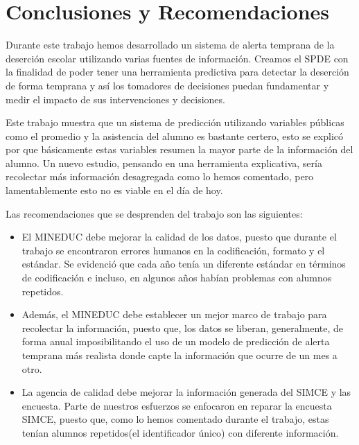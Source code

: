 \chapter{Conclusiones y Recomendaciones}
\label{ch:concureco}

Durante este trabajo hemos desarrollado un sistema de alerta temprana de la deserción escolar utilizando varias fuentes de información. Creamos el SPDE con la finalidad de poder tener una herramienta predictiva para detectar la deserción de forma temprana y así los tomadores de decisiones puedan fundamentar y medir el impacto de sus intervenciones y decisiones.

Este trabajo muestra que un sistema de predicción utilizando variables públicas como el promedio y la asistencia del alumno es bastante certero, esto se explicó por que básicamente estas variables resumen la mayor parte de la información del alumno. Un nuevo estudio, pensando en una herramienta explicativa, sería recolectar más información desagregada como lo hemos comentado, pero lamentablemente esto no es viable en el día de hoy.

Las recomendaciones que se desprenden del trabajo son las siguientes:
\begin{itemize}
\item El MINEDUC debe mejorar la calidad de los datos, puesto que durante el trabajo se encontraron errores humanos en la codificación, formato y el estándar. Se evidenció que cada año tenía un diferente estándar en términos de codificación e incluso, en algunos años habían problemas con alumnos repetidos.
\item Además, el MINEDUC debe establecer un mejor marco de trabajo para recolectar la información, puesto que, los datos se liberan, generalmente, de forma anual imposibilitando el uso de un modelo de predicción de alerta temprana más realista donde capte la información que ocurre de un mes a otro.
\item La agencia de calidad debe mejorar la información generada del SIMCE y las encuesta. Parte de nuestros esfuerzos se enfocaron en reparar la encuesta SIMCE, puesto que, como lo hemos comentado durante el trabajo, estas tenían alumnos repetidos(el identificador único) con diferente información.
\end{itemize}